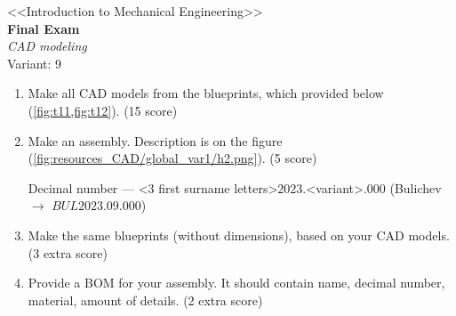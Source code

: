\documentclass[12pt]{article}
\newcommand\pic[1]{(\cref{#1})} %
\begin{document}
\begin{center}
    \LARGE <<Introduction to Mechanical Engineering>> \\ \textbf{Final Exam} \\ \textit{CAD modeling} \\ Variant: 9
\end{center}
\begin{enumerate}
    \item Make all CAD models from the blueprints, which provided below \pic{fig:t11,fig:t12}. (15 score)
    \item Make an assembly. Description is on the figure \pic{fig:resources_CAD/global_var1/h2.png}. (5 score)
     
    Decimal number --- <3 first surname letters>$2023.$<variant>$.000$ (Bulichev $\rightarrow$ $BUL2023.09.000$) 
    \item  Make the same blueprints (without dimensions), based on your CAD models. (3 extra score)
    \item  Provide a BOM for your assembly. It should contain name, decimal number, material, amount of details. (2 extra score)
\end{enumerate}
\end{document}
